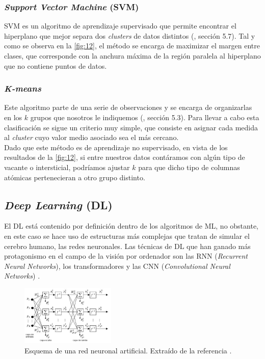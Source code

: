 \subsubsection{\textit{Support Vector Machine} (SVM)}
SVM es un algoritmo de aprendizaje supervisado que permite encontrar el hiperplano que mejor separa dos \textit{clusters} de datos distintos (\cite{databook}, sección 5.7). Tal y como se observa en la \autoref{fig:12}, el método se encarga de maximizar el margen entre clases, que corresponde con la anchura máxima de la región paralela al hiperplano que no contiene puntos de datos.

\subsubsection{\textit{K-means}}
Este algoritmo parte de una serie de observaciones y se encarga de organizarlas en los $k$ grupos que nosotros le indiquemos (\cite{databook}, sección 5.3). Para llevar a cabo esta clasificación se sigue un criterio muy simple, que consiste en asignar cada medida al \textit{cluster} cuyo valor medio asociado sea el más cercano.\\

Dado que este método es de aprendizaje no supervisado, en vista de los resultados de la \autoref{fig:12}, si entre nuestros datos contáramos con algún tipo de vacante o intersticial, podríamos ajustar $k$ para que dicho tipo de columnas atómicas pertenecieran a otro grupo distinto.

\subsection{\textit{Deep Learning} (DL)}
El DL está contenido por definición dentro de los algoritmos de ML, no obstante, en este caso se hace uso de estructuras más complejas que tratan de simular el cerebro humano, las redes neuronales. Las técnicas de DL que han ganado más protagonismo en el campo de la visión por ordenador son las RNN (\textit{Recurrent Neural Networks}), los transformadores y las CNN (\textit{Convolutional Neural Networks}) \cite{ml} \cite{CNN}.\\

\begin{figure}
    \includegraphics[width=0.40\textwidth]{fig/Fig13.png}
    \caption{Esquema de una red neuronal artificial. Extraído de la referencia \cite{red}.}
    \label{fig:13}
\end{figure} 

